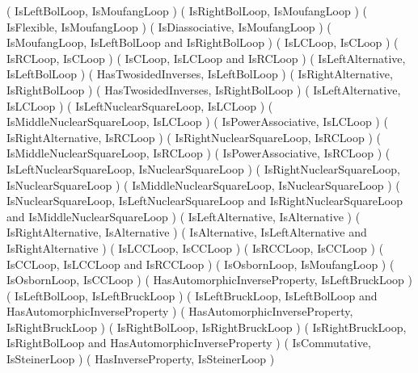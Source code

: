 ( IsLeftBolLoop, IsMoufangLoop )
( IsRightBolLoop, IsMoufangLoop )
( IsFlexible, IsMoufangLoop )
( IsDiassociative, IsMoufangLoop )
( IsMoufangLoop, IsLeftBolLoop and IsRightBolLoop )
( IsLCLoop, IsCLoop )
( IsRCLoop, IsCLoop )
( IsCLoop, IsLCLoop and IsRCLoop )
( IsLeftAlternative, IsLeftBolLoop )
( HasTwosidedInverses, IsLeftBolLoop )
( IsRightAlternative, IsRightBolLoop )
( HasTwosidedInverses, IsRightBolLoop )
( IsLeftAlternative, IsLCLoop )
( IsLeftNuclearSquareLoop, IsLCLoop )
( IsMiddleNuclearSquareLoop, IsLCLoop )
( IsPowerAssociative, IsLCLoop )
( IsRightAlternative, IsRCLoop )
( IsRightNuclearSquareLoop, IsRCLoop )
( IsMiddleNuclearSquareLoop, IsRCLoop )
( IsPowerAssociative, IsRCLoop )
( IsLeftNuclearSquareLoop, IsNuclearSquareLoop )
( IsRightNuclearSquareLoop, IsNuclearSquareLoop )
( IsMiddleNuclearSquareLoop, IsNuclearSquareLoop )
( IsNuclearSquareLoop, IsLeftNuclearSquareLoop and IsRightNuclearSquareLoop
    and IsMiddleNuclearSquareLoop )
( IsLeftAlternative, IsAlternative )
( IsRightAlternative, IsAlternative )
( IsAlternative, IsLeftAlternative and IsRightAlternative )
( IsLCCLoop, IsCCLoop )
( IsRCCLoop, IsCCLoop )
( IsCCLoop, IsLCCLoop and IsRCCLoop )
( IsOsbornLoop, IsMoufangLoop )
( IsOsbornLoop, IsCCLoop )
( HasAutomorphicInverseProperty, IsLeftBruckLoop )
( IsLeftBolLoop, IsLeftBruckLoop )
( IsLeftBruckLoop, IsLeftBolLoop and HasAutomorphicInverseProperty )
( HasAutomorphicInverseProperty, IsRightBruckLoop )
( IsRightBolLoop, IsRightBruckLoop )
( IsRightBruckLoop, IsRightBolLoop and HasAutomorphicInverseProperty )
( IsCommutative, IsSteinerLoop )
( HasInverseProperty, IsSteinerLoop )
\endtt
